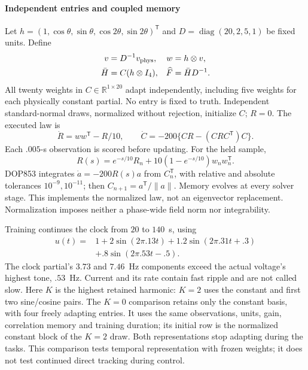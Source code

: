 \paragraph{Independent entries and coupled memory}
Let $h=(1,\cos\theta,\sin\theta,\cos2\theta,\sin2\theta)^{\mathsf T}$ and
$D=\operatorname{diag}(20,2,5,1)$ be fixed units. Define
\begin{align}
 v&=D^{-1}v_{\rm phys},&w&=h\otimes v,\nonumber\\
 \bar H&=C(h\otimes I_4),&\widehat F&=\bar H D^{-1}.
 \label{eq:df_lift}
\end{align}
All twenty weights in $C\in\mathbb R^{1\times20}$ adapt independently,
including five weights for each physically constant partial. No entry is
fixed to truth. Independent standard-normal draws, normalized without
rejection, initialize $C$; $R=0$. The executed law is
\begin{equation}
 \dot R=ww^{\mathsf T}-R/10,\qquad
 \dot C=-200\{CR-(CRC^{\mathsf T})C\}.
 \label{eq:df_update}
\end{equation}
Each $.005$-s observation is scored before updating. For the held sample,
\begin{equation}
 R(s)=e^{-s/10}R_n+10(1-e^{-s/10})w_nw_n^{\mathsf T}.
 \label{eq:df_memory}
\end{equation}
DOP853 integrates $\dot a=-200R(s)a$ from $C_n^{\mathsf T}$, with relative
and absolute tolerances $10^{-9},10^{-11}$; then
$C_{n+1}=a^{\mathsf T}/\|a\|$. Memory evolves at every solver stage.
This implements the normalized law, not an eigenvector replacement.
Normalization imposes neither a phase-wide field norm nor integrability.

Training continues the clock from $20$ to $140$~s, using
\begin{equation}
 \begin{split}
 u(t)={}&1+2\sin(2\pi .13t)+1.2\sin(2\pi .31t+.3)\\
       &+.8\sin(2\pi .53t-.5).
 \end{split}\label{eq:df_train_input}
\end{equation}
The clock partial's $3.73$ and $7.46$~Hz components exceed the actual voltage's
highest tone, $.53$~Hz. Current and its rate contain fast ripple and are not
called slow. Here $K$ is the highest retained harmonic: $K=2$ uses the
constant and first two sine/cosine pairs. The $K=0$ comparison retains only
the constant basis, with four freely adapting entries. It uses the same
observations, units, gain, correlation memory and training duration; its initial
row is the normalized constant block of the $K=2$ draw. Both representations
stop adapting during the tasks. This comparison tests temporal representation
with frozen weights; it does not test continued direct tracking during control.

